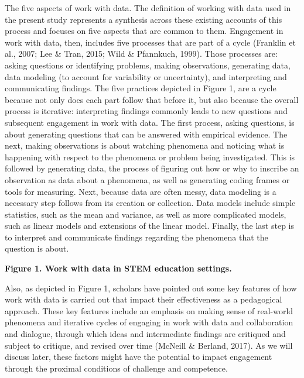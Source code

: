 \documentclass[]{book}
\theoremstyle{definition}
\theoremstyle{definition}
\theoremstyle{definition}
\theoremstyle{remark}
\begin{document}
The five aspects of work with data. The definition of working with data
used in the present study represents a synthesis across these existing
accounts of this process and focuses on five aspects that are common to
them. Engagement in work with data, then, includes five processes that
are part of a cycle (Franklin et al., 2007; Lee \& Tran, 2015; Wild \&
Pfannkuch, 1999). Those processes are: asking questions or identifying
problems, making observations, generating data, data modeling (to
account for variability or uncertainty), and interpreting and
communicating findings. The five practices depicted in Figure 1, are a
cycle because not only does each part follow that before it, but also
because the overall process is iterative: interpreting findings commonly
leads to new questions and subsequent engagement in work with data. The
first process, asking questions, is about generating questions that can
be answered with empirical evidence. The next, making observations is
about watching phenomena and noticing what is happening with respect to
the phenomena or problem being investigated. This is followed by
generating data, the process of figuring out how or why to inscribe an
observation as data about a phenomena, as well as generating coding
frames or tools for measuring. Next, because data are often messy, data
modeling is a necessary step follows from its creation or collection.
Data models include simple statistics, such as the mean and variance, as
well as more complicated models, such as linear models and extensions of
the linear model. Finally, the last step is to interpret and communicate
findings regarding the phenomena that the question is about.

\textbf{Figure 1. Work with data in STEM education settings.}

Also, as depicted in Figure 1, scholars have pointed out some key
features of how work with data is carried out that impact their
effectiveness as a pedagogical approach. These key features include an
emphasis on making sense of real-world phenomena and iterative cycles of
engaging in work with data and collaboration and dialogue, through which
ideas and intermediate findings are critiqued and subject to critique,
and revised over time (McNeill \& Berland, 2017). As we will discuss
later, these factors might have the potential to impact engagement
through the proximal conditions of challenge and competence.
\end{document}
